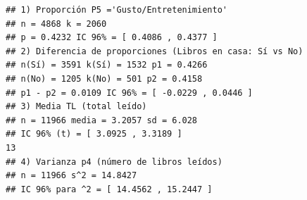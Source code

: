 \documentclass[aps,reprint]{revtex4-2}
\begin{document}
\begin{lstlisting}
## 1) Proporción P5 ='Gusto/Entretenimiento'
## n = 4868 k = 2060
## p = 0.4232 IC 96% = [ 0.4086 , 0.4377 ]
## 2) Diferencia de proporciones (Libros en casa: Sí vs No)
## n(Sí) = 3591 k(Sí) = 1532 p1 = 0.4266
## n(No) = 1205 k(No) = 501 p2 = 0.4158
## p1 - p2 = 0.0109 IC 96% = [ -0.0229 , 0.0446 ]
## 3) Media TL (total leído)
## n = 11966 media = 3.2057 sd = 6.028
## IC 96% (t) = [ 3.0925 , 3.3189 ]
13
## 4) Varianza p4 (número de libros leídos)
## n = 11966 s^2 = 14.8427
## IC 96% para ^2 = [ 14.4562 , 15.2447 ]
\end{lstlisting}


\nocite{*}

\end{document}
